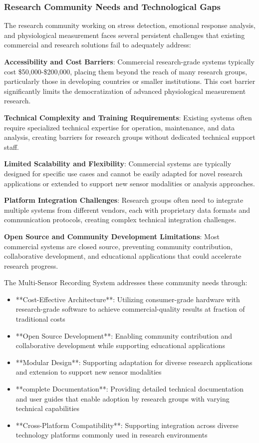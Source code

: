 \documentclass[11pt,a4paper]{article}
\begin{document}
\subsubsection{Research Community Needs and Technological Gaps}

The research community working on stress detection, emotional response analysis,
and physiological measurement faces
several persistent challenges that existing commercial and research solutions
fail to adequately address:

\textbf{Accessibility and Cost Barriers}: Commercial research-grade systems typically cost \$50,000-\$200,000, placing them
beyond the reach of many research groups, particularly those in developing
countries or smaller institutions. This cost
barrier significantly limits the democratization of advanced physiological
measurement research.

\textbf{Technical Complexity and Training Requirements}: Existing systems often require specialized technical expertise for
operation, maintenance, and data analysis, creating barriers for research groups
without dedicated technical support
staff.

\textbf{Limited Scalability and Flexibility}: Commercial systems are typically designed for specific use cases and cannot be
easily adapted for novel research applications or extended to support new sensor
modalities or analysis approaches.

\textbf{Platform Integration Challenges}: Research groups often need to integrate multiple systems from different vendors,
each with proprietary data formats and communication protocols, creating complex
technical integration challenges.

\textbf{Open Source and Community Development Limitations}: Most commercial systems are closed source, preventing community
contribution, collaborative development, and educational applications that could
accelerate research progress.

The Multi-Sensor Recording System addresses these community needs through:

\begin{itemize}
\item **Cost-Effective Architecture**: Utilizing consumer-grade hardware with
research-grade software to achieve
  commercial-quality results at fraction of traditional costs
\item **Open Source Development**: Enabling community contribution and
collaborative development while supporting
  educational applications
\item **Modular Design**: Supporting adaptation for diverse research
applications and extension to support new sensor
  modalities
\item **complete Documentation**: Providing detailed technical documentation and
user guides that enable adoption by
  research groups with varying technical capabilities
\item **Cross-Platform Compatibility**: Supporting integration across diverse
technology platforms commonly used in research
  environments

\end{itemize}
\end{document}
